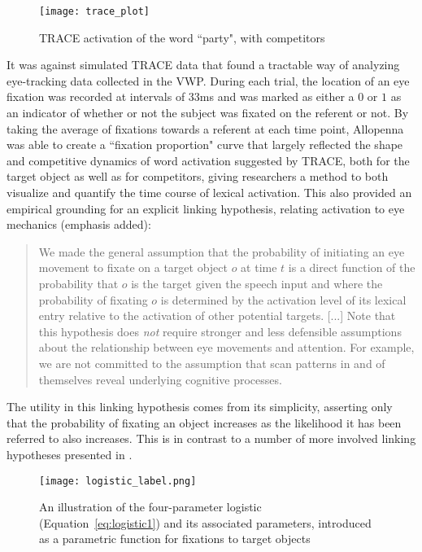 \begin{figure}[H]
\centering
\texttt{[image: trace\_plot]}
\caption{TRACE activation of the word ``party", with competitors}
\label{fig:trace_plot}
\end{figure}



It was against simulated TRACE data that \citet{allopenna1998tracking} found a tractable way of analyzing eye-tracking data collected in the VWP.  During each trial, the location of an eye fixation was recorded at intervals of 33ms and was marked as either a $0$ or $1$ as an indicator of whether or not the subject was fixated on the referent or not. By taking the average of fixations towards a referent at each time point, Allopenna was able to create a ``fixation proportion" curve that largely reflected the shape and competitive dynamics of word activation suggested by TRACE, both for the target object as well as for competitors, giving researchers a method to both visualize and quantify the time course of lexical activation. This also provided an empirical grounding for an explicit linking hypothesis, relating activation to eye mechanics  (emphasis added):

\begin{quote}
We made the general assumption that the probability of initiating an eye movement to fixate on a target object $o$ at time $t$ is a direct function of the probability that $o$ is the target given the speech input and where the probability of fixating $o$ is determined by the activation level of its lexical entry relative to the activation of other potential targets. [...] Note that this hypothesis does \emph{not} require stronger and less defensible assumptions about the relationship between eye  movements and attention. For example, we are not committed to the assumption that scan patterns in and of themselves reveal underlying cognitive processes. \citep{allopenna1998tracking}
\end{quote}

The utility in this linking hypothesis comes from its simplicity, asserting only that the probability of fixating an object increases as the likelihood it has been referred to also increases. This is in contrast to a number of more involved linking hypotheses presented in \citet{Magnuson2019}.


\begin{figure}[H]
\centering
\texttt{[image: logistic\_label.png]}
\caption{An illustration of the four-parameter logistic (Equation~\ref{eq:logistic1}) and its associated parameters, introduced as a parametric function for fixations to target objects}
\label{fig:logistic_definition}
\end{figure}

